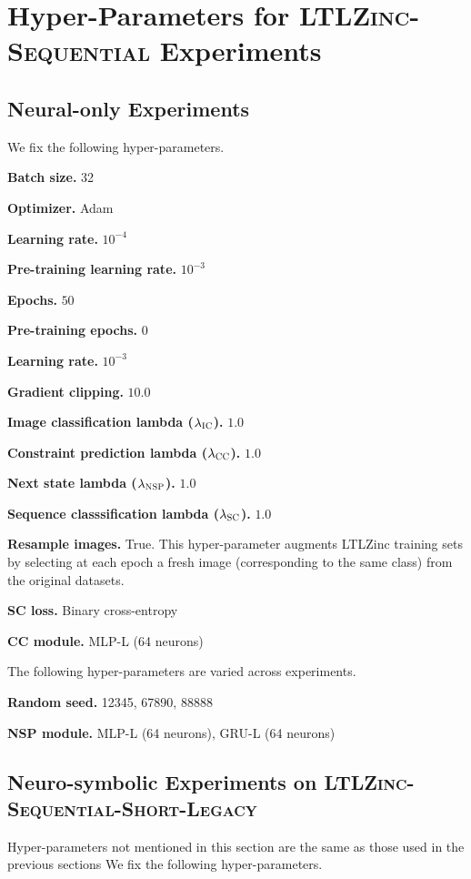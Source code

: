 \chapter{Hyper-Parameters for \textsc{LTLZinc-Sequential} Experiments}\label{app:ltlzinchyper}

\section{Neural-only Experiments}\label{app:neur}
We fix the following hyper-parameters.

\noindent\textbf{Batch size.} 32

\noindent\textbf{Optimizer.} Adam

\noindent\textbf{Learning rate.} $10^{-4}$

\noindent\textbf{Pre-training learning rate.} $10^{-3}$

\noindent\textbf{Epochs.} $50$

\noindent\textbf{Pre-training epochs.} $0$

\noindent\textbf{Learning rate.} $10^{-3}$

\noindent\textbf{Gradient clipping.} $10.0$

\noindent\textbf{Image classification lambda ($\lambda_\textsc{IC}$).} $1.0$

\noindent\textbf{Constraint prediction lambda ($\lambda_\textsc{CC}$).} $1.0$

\noindent\textbf{Next state lambda ($\lambda_\textsc{NSP}$).} $1.0$

\noindent\textbf{Sequence classsification lambda ($\lambda_\textsc{SC}$).} $1.0$

\noindent\textbf{Resample images.} True. This hyper-parameter augments LTLZinc training sets by selecting at each epoch a fresh image (corresponding to the same class) from the original datasets.

\noindent\textbf{\textsc{SC} loss.} Binary cross-entropy

\noindent\textbf{\textsc{CC} module.} MLP-L (64 neurons)


The following hyper-parameters are varied across experiments.

\noindent\textbf{Random seed.} 12345, 67890, 88888


\noindent\textbf{\textsc{NSP} module.} MLP-L (64 neurons), GRU-L (64 neurons)

\section{Neuro-symbolic Experiments on \textsc{LTLZinc-Sequential-Short-Legacy}}\label{app:main}
Hyper-parameters not mentioned in this section are the same as those used in the previous sections
We fix the following hyper-parameters.

